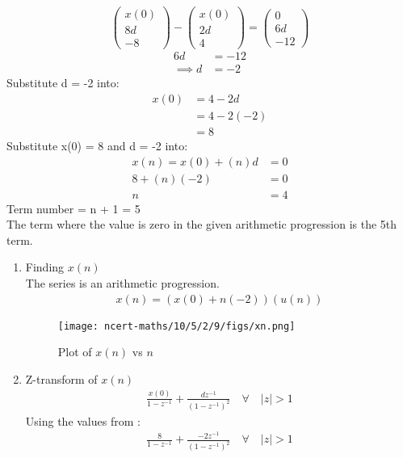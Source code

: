 \documentclass[journal,12pt,twocolumn]{IEEEtran}
\theoremstyle{remark}
\begin{document}
\begin{equation}
\left(
\begin{array}{r}
x(0) \\
8d \\
-8 
\end{array}
\right)
-
\left(
\begin{array}{r}
x(0) \\
2d \\
4
\end{array}
\right)
=
\left(
\begin{array}{r}
0 \\
6d \\
-12
\end{array}
\right)
\end{equation}
\begin{align}
6d &= -12 \\
\implies d &= -2 
\end{align}
Substitute d = -2 into:
\begin{align}
x(0) &= 4 - 2d\\
&= 4 - 2(-2)\\
&= 8
\end{align}
Substitute x(0) = 8 and d = -2 into:
\begin{align}
x(n) = x(0) + (n)d &= 0 \\
8 + (n)(-2) &= 0 \\
n &= 4
\end{align}
Term number = n + 1 = 5 \\
The term where the value is zero in the given arithmetic progression is the 5th term.\\
\begin{enumerate}
\item Finding $x(n)$ \\
The series is an arithmetic progression.
\begin{align}
x(n) = (x(0) + n(-2))(u(n))
\end{align}
\begin{figure}[h!]
    \centering
    \texttt{[image: ncert-maths/10/5/2/9/figs/xn.png]}
    \caption{Plot of $x(n)$ vs $n$}
    \label{fig:1909}
\end{figure}
\item Z-transform of $x(n)$ \\
\begin{align}
\frac{x(0)}{1 - z^{-1}} + \frac{dz^{-1}}{(1 - z^{-1})^2} \quad \forall \quad |z| > 1
\end{align}
Using the values from :
\begin{align}
\frac{8}{1 - z^{-1}} + \frac{-2z^{-1}}{(1 - z^{-1})^2} \quad \forall \quad |z| > 1
\end{align}
\end{enumerate}
\end{document}
